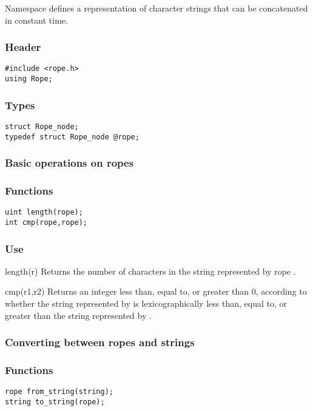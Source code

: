 Namespace  defines a representation of character strings that
can be concatenated in constant time.

\subsubsection*{Header}
\begin{verbatim}
#include <rope.h>
using Rope;
\end{verbatim}

\subsubsection*{Types}
\begin{verbatim}
struct Rope_node;
typedef struct Rope_node @rope;
\end{verbatim}


\subsubsection*{Basic operations on ropes}
\subsubsection*{Functions}
\begin{verbatim}
uint length(rope);
int cmp(rope,rope);
\end{verbatim}

\subsubsection*{Use}

\begin{defun}{length}{(r)}
Returns the number of characters in the string represented by rope
.
\end{defun}

\begin{defun}{cmp}{(r1,r2)}
Returns an integer less than, equal to, or greater than 0, according to
whether the string represented by  is lexicographically less
than, equal to, or greater than the string represented by .
\end{defun}

\subsubsection*{Converting between ropes and strings}
\subsubsection*{Functions}
\begin{verbatim}
rope from_string(string);
string to_string(rope);
\end{verbatim}

